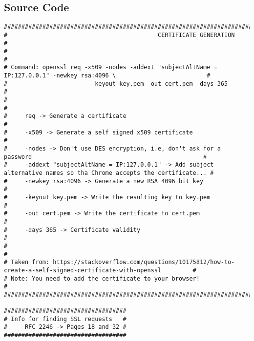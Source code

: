\documentclass[landscape]{article}
\begin{document}
        \subsection{Source Code}
            \begin{verbatim}
#########################################################################################################################
#                                           CERTIFICATE GENERATION                                                      #
#                                                                                                                       #
# Command: openssl req -x509 -nodes -addext "subjectAltName = IP:127.0.0.1" -newkey rsa:4096 \                          #
#                        -keyout key.pem -out cert.pem -days 365                                                        #
#                                                                                                                       #
#     req -> Generate a certificate                                                                                     #
#     -x509 -> Generate a self signed x509 certificate                                                                  #
#     -nodes -> Don't use DES encryption, i.e, don't ask for a password                                                 #
#     -addext "subjectAltName = IP:127.0.0.1" -> Add subject alternative names so tha Chrome accepts the certificate... #
#     -newkey rsa:4096 -> Generate a new RSA 4096 bit key                                                               #
#     -keyout key.pem -> Write the resulting key to key.pem                                                             #
#     -out cert.pem -> Write the certificate to cert.pem                                                                #
#     -days 365 -> Certificate validity                                                                                 #
#                                                                                                                       #
# Taken from: https://stackoverflow.com/questions/10175812/how-to-create-a-self-signed-certificate-with-openssl         #
# Note: You need to add the certificate to your browser!                                                                #
#########################################################################################################################

###################################
# Info for finding SSL requests   #
#     RFC 2246 -> Pages 18 and 32 #
###################################


\end{verbatim}
\end{document}
